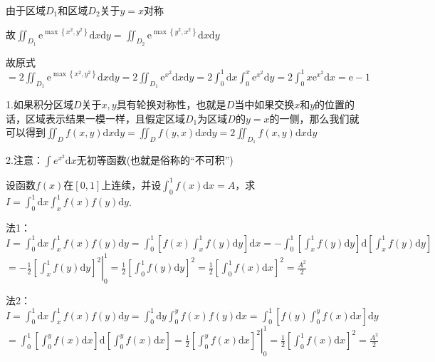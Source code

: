 \begin{xiti}
\begin{solution}
		由于区域$D_{1}$和区域$D_{2}$关于$y=x$对称
		
		故$\iint_{D_{1}} \mathrm{e}^{\max \left\{x^{2}, y^{2}\right\}} \mathrm{d} x \mathrm{d} y=\iint_{D_{2}} \mathrm{e}^{\max \left\{y^{2}, x^{2}\right\}} \mathrm{d} x \mathrm{d} y$
		
		故原式$=2 \iint_{D_{1}} \mathrm{e}^{\max \left\{x^{2}, y^{2}\right\}} \mathrm{d} x \mathrm{d} y=2 \iint_{D_{1}} \mathrm{e}^{x^{2}} \mathrm{d} x \mathrm{d} y=2 \int_{0}^{1} \mathrm{d} x \int_{0}^{x} \mathrm{e}^{x^{2}} \mathrm{d} y=2 \int_{0}^{1} x \mathrm{e}^{x^{2}} \mathrm{d} x=\mathrm{e}-1$
		
		\begin{note}
			
			1.如果积分区域$D$关于$x,y$具有轮换对称性，也就是$D$当中如果交换$x$和$y$的位置的话，区域表示结果一模一样，且假定区域$D_{1}$为区域$D$的$y=x$的一侧，那么我们就可以得到$\iint_{D} f(x,y) \mathrm{d} x \mathrm{d} y= \iint_{D} f(y,x) \mathrm{d} x \mathrm{d} y = 2\iint_{D_{1}} f(x,y) \mathrm{d} x \mathrm{d} y$
			
			2.注意：$\int e^{x^{2}} \mathrm{d} x$无初等函数(也就是俗称的“不可积”)
		\end{note}
	\end{solution}
	\item 设函数$f(x)$在$[0,1]$上连续，并设$\int_{0}^{1} f(x) \mathrm{d} x=A$，求$I=\int_{0}^{1} \mathrm{d} x \int_{x}^{1} f(x) f(y) \mathrm{d} y$.
	\begin{solution}
		法1：$I=\int_{0}^{1} \mathrm{d} x \int_{x}^{1} f(x) f(y) \mathrm{d} y=\int_{0}^{1}\left[f(x) \int_{x}^{1} f(y) \mathrm{d} y\right] \mathrm{d} x=-\int_{0}^{1}\left[\int_{x}^{1} f(y) \mathrm{d} y\right] \mathrm{d}\left[\int_{x}^{1} f(y) \mathrm{d} y\right]$
		$=-\frac{1}{2}\left.\left[\int_{x}^{1} f(y) \mathrm{d} y\right]^{2}\right|_{0} ^{1}=\frac{1}{2}\left[\int_{0}^{1} f(y) \mathrm{d} y\right]^{2}=\frac{1}{2}\left[\int_{0}^{1} f(x) \mathrm{d} x\right]^{2}=\frac{A^{2}}{2}$
		
		法2：$I=\int_{0}^{1} \mathrm{d} x \int_{x}^{1} f(x) f(y) \mathrm{d} y=\int_{0}^{1} \mathrm{d} y \int_{0}^{y} f(x) f(y) \mathrm{d} x=\int_{0}^{1}\left[f(y) \int_{0}^{y} f(x) \mathrm{d} x\right] \mathrm{d} y$
		$=\int_{0}^{1}\left[\int_{0}^{y} f(x) \mathrm{d} x\right] \mathrm{d}\left[\int_{0}^{y} f(x) \mathrm{d} x\right]=\frac{1}{2}\left.\left[\int_{0}^{y} f(x) \mathrm{d} x\right]^{2}\right|_{0} ^{1}=\frac{1}{2}\left[\int_{0}^{1} f(x) \mathrm{d} x\right]^{2}=\frac{A^{2}}{2}$
		

\end{solution}
\end{xiti}
